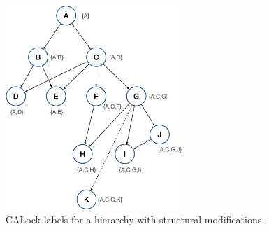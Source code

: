 \begin{figure}
	\centering
	\captionsetup{justification=centering}
	\includegraphics[width=0.6\textwidth]{figures/CALock_example_with_SM.png}
	\caption{CALock labels for a hierarchy with structural modifications.}
	\label{fig:CAstructuralModification}
\end{figure}




